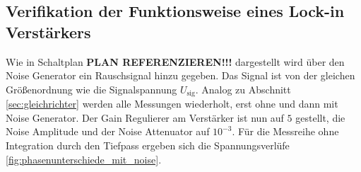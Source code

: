 \subsection[]{Verifikation der Funktionsweise eines Lock-in Verstärkers}
Wie in Schaltplan \textbf{PLAN REFERENZIEREN!!!} dargestellt wird über den Noise Generator ein Rauschsignal hinzu gegeben.
Das Signal ist von der gleichen Größenordnung wie die Signalspannung $U_\text{sig}$.
Analog zu Abschnitt \ref{sec:gleichrichter} werden alle Messungen wiederholt, erst ohne und dann mit Noise Generator.
Der Gain Regulierer am Verstärker ist nun auf $5$ gestellt, die Noise Amplitude und der Noise Attenuator auf $10^{-3}$.
Für die Messreihe ohne Integration durch den Tiefpass ergeben sich die Spannungsverlüfe \ref{fig:phasenunterschiede_mit_noise}.
%
%
